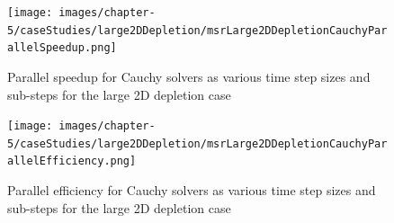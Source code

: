 \clearpage


\clearpage

\begin{figure}[p]
    \centering
    \texttt{[image: images/chapter-5/caseStudies/large2DDepletion/msrLarge2DDepletionCauchyParallelSpeedup.png]}
    \caption{Parallel speedup for Cauchy solvers as various time step sizes and sub-steps for the large 2D depletion case}
    \label{fig:large_2D_depletion_cauchy_speedup}
\end{figure}

\clearpage

\begin{figure}[p]
    \centering
    \texttt{[image: images/chapter-5/caseStudies/large2DDepletion/msrLarge2DDepletionCauchyParallelEfficiency.png]}
    \caption{Parallel efficiency for Cauchy solvers as various time step sizes and sub-steps for the large 2D depletion case}
    \label{fig:large_2D_depletion_cauchy_parallel_eff}
\end{figure}